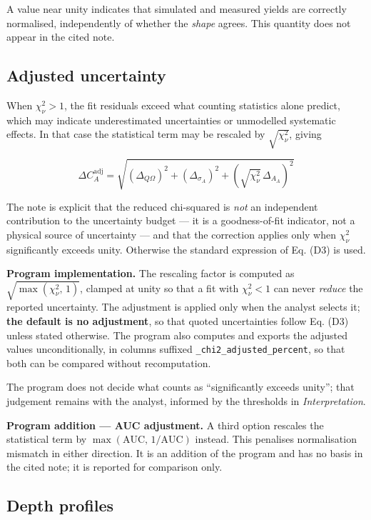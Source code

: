A value near unity indicates that simulated and measured yields are
correctly normalised, independently of whether the \emph{shape} agrees.
This quantity does not appear in the cited note.

\subsection{Adjusted uncertainty}\label{adjusted-uncertainty}

When \(\chi^2_\nu > 1\), the fit residuals exceed what counting
statistics alone predict, which may indicate underestimated
uncertainties or unmodelled systematic effects. In that case the
statistical term may be rescaled by \(\sqrt{\chi^2_\nu}\), giving
\citep[Eq. 6]{diallo2025iba}

\[
\Delta C_A^{\mathrm{adj}} = \sqrt{(\Delta_{Q\Omega})^2 + (\Delta_{\sigma_A})^2 + \left(\sqrt{\chi^2_\nu}\, \Delta_{A_A}\right)^2} \tag{D6}
\]

The note is explicit that the reduced chi-squared is \emph{not} an
independent contribution to the uncertainty budget --- it is a
goodness-of-fit indicator, not a physical source of uncertainty --- and
that the correction applies only when \(\chi^2_\nu\) significantly
exceeds unity. Otherwise the standard expression of Eq. (D3) is used.

\textbf{Program implementation.} The rescaling factor is computed as
\(\sqrt{\max\left(\chi^2_\nu,\, 1\right)}\), clamped at unity so that a
fit with \(\chi^2_\nu < 1\) can never \emph{reduce} the reported
uncertainty. The adjustment is applied only when the analyst selects it;
\textbf{the default is no adjustment}, so that quoted uncertainties
follow Eq. (D3) unless stated otherwise. The program also computes and
exports the adjusted values unconditionally, in columns suffixed
\texttt{\_chi2\_adjusted\_percent}, so that both can be compared without
recomputation.

The program does not decide what counts as ``significantly exceeds
unity''; that judgement remains with the analyst, informed by the
thresholds in \emph{Interpretation}.

\textbf{Program addition --- AUC adjustment.} A third option rescales
the statistical term by
\(\max\left(\mathrm{AUC},\, 1/\mathrm{AUC}\right)\) instead. This
penalises normalisation mismatch in either direction. It is an addition
of the program and has no basis in the cited note; it is reported for
comparison only.

\subsection{Depth profiles}\label{depth-profiles}

